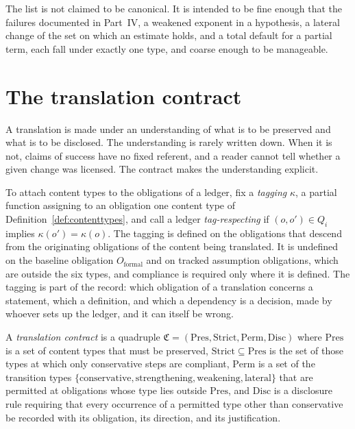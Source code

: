 The list is not claimed to be canonical. It is intended to be fine enough that the failures documented in Part~IV, a weakened exponent in a hypothesis, a lateral change of the set on which an estimate holds, and a total default for a partial term, each fall under exactly one type, and coarse enough to be manageable.

\section{The translation contract}

A translation is made under an understanding of what is to be preserved and what is to be disclosed. The understanding is rarely written down. When it is not, claims of success have no fixed referent, and a reader cannot tell whether a given change was licensed. The contract makes the understanding explicit.

To attach content types to the obligations of a ledger, fix a \emph{tagging} $\kappa$, a partial function assigning to an obligation one content type of Definition~\ref{def:contenttypes}, and call a ledger \emph{tag-respecting} if $(o,o')\in Q_i$ implies $\kappa(o')=\kappa(o)$. The tagging is defined on the obligations that descend from the originating obligations of the content being translated. It is undefined on the baseline obligation $O_{\mathrm{formal}}$ and on tracked assumption obligations, which are outside the six types, and compliance is required only where it is defined. The tagging is part of the record: which obligation of a translation concerns a statement, which a definition, and which a dependency is a decision, made by whoever sets up the ledger, and it can itself be wrong.

\begin{definition}
\label{def:contract}
A \emph{translation contract} is a quadruple $\mathfrak{C} = (\mathrm{Pres}, \mathrm{Strict}, \mathrm{Perm}, \mathrm{Disc})$ where $\mathrm{Pres}$ is a set of content types that must be preserved, $\mathrm{Strict}\subseteq\mathrm{Pres}$ is the set of those types at which only conservative steps are compliant, $\mathrm{Perm}$ is a set of the transition types $\{\text{conservative}, \text{strengthening}, \text{weakening}, \text{lateral}\}$ that are permitted at obligations whose type lies outside $\mathrm{Pres}$, and $\mathrm{Disc}$ is a disclosure rule requiring that every occurrence of a permitted type other than conservative be recorded with its obligation, its direction, and its justification.
\end{definition}


